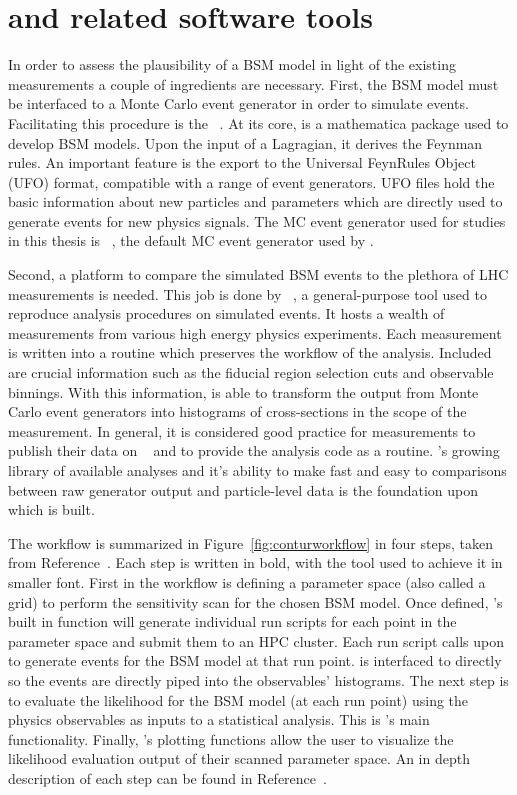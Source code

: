 \section{\contur and related software tools}
\label{sec:reinterpretsoftware}

In order to assess the plausibility of a BSM model in light of the existing measurements a couple of ingredients are necessary. First, the BSM model must be interfaced to a Monte Carlo event generator in order to simulate events. Facilitating this procedure is the \FeynRules~\cite{}. At its core, \FeynRules is a mathematica package used to develop BSM models. Upon the input of a Lagragian, it derives the Feynman rules. An important feature is the export to the Universal FeynRules Object~\cite{ufo} (UFO) format, compatible with a range of event generators. UFO files hold the basic information about new particles and parameters which are directly used to generate events for new physics signals. The MC event generator used for studies in this thesis is \herwig~\cite{herwig7}, the default MC event generator used by \contur. 

Second, a platform to compare the simulated BSM events to the plethora of LHC measurements is needed. This job is done by \rivet~\cite{rivet}, a general-purpose tool used to reproduce analysis procedures on simulated events. It hosts a wealth of measurements from various high energy physics experiments. Each measurement is written into a \rivet routine which preserves the workflow of the analysis. Included are crucial information such as the fiducial region selection cuts and observable binnings. With this information, \rivet is able to transform the output from Monte Carlo event generators into histograms of cross-sections in the scope of the measurement. In general, it is considered good practice for \LHC measurements to publish their data on \HEPData~\cite{HEPData} and to provide the analysis code as a \rivet routine. \rivet's growing library of available analyses and it's ability to make fast and easy to comparisons between raw generator output and particle-level data is the foundation upon which \contur is built. 

The \contur workflow is summarized in Figure~\ref{fig:conturworkflow} in four steps, taken from Reference~\cite{conturmanual}. Each step is written in bold, with the tool used to achieve it in smaller font. First in the workflow is defining a parameter space (also called a grid) to perform the sensitivity scan for the chosen BSM model. Once defined, \contur's built in function will generate individual run scripts for each point in the parameter space and submit them to an HPC cluster. Each run script calls upon \herwig to generate events for the BSM model at that run point. \herwig is interfaced to \rivet directly so the events are directly piped into the observables' histograms. The next step is to evaluate the likelihood for the BSM model (at each run point) using the physics observables as inputs to a statistical analysis. This is \contur's main functionality. Finally, \contur's plotting functions allow the user to visualize the likelihood evaluation output of their scanned parameter space. An in depth description of each step can be found in Reference~\cite{conturmanual}.
